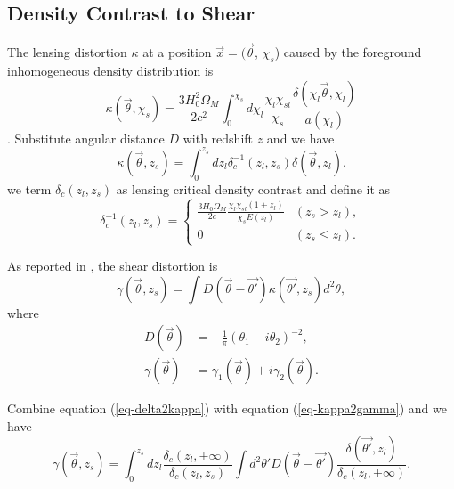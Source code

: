 \documentclass[twocolumn]{aastex62}
\newcommand{\vecb}[1]{{#1}}
\begin{document}
\subsection{Density Contrast to Shear}
The lensing distortion $\kappa$ at a position $\vec{x}=(\vec{\theta}$, $\chi_s$) caused by the foreground inhomogeneous density distribution is
\begin{equation}
\kappa(\vec{\theta},\chi_s)=\frac{3H_0^2\Omega_M}{2 c^2} \int_0^{\chi_s} d\chi_l \frac{\chi_l \chi_{sl}}{\chi_s} \frac{\delta(\chi_l \vec{\theta},\chi_l)}{a(\chi_l)}
\end{equation}
\citep{massMap-Glimpse3D2014}.
Substitute angular distance $D$ with redshift $z$ and we have
\begin{equation}\label{eq-delta2kappa}
\kappa(\vec{\theta},z_s)=\int_0^{z_s} dz_l \delta_{c}^{-1}(z_l,z_s)\delta(\vec{\theta},z_l).
\end{equation}
we term $\delta_{c}(z_l,z_s)$ as lensing critical density contrast and define it as
\begin{equation}
\delta_{c}^{-1}(z_l,z_s) =
\begin{cases}
\frac{3H_0\Omega_M}{2 c} \frac{\chi_l \chi_{sl} (1+z_l)}{ \chi_s E(z_l)} & (z_s>z_l),\\
0&(z_s \leq z_l).
\end{cases}
\end{equation}

As reported in \citet{massMap-KS1993}, the shear distortion is
\begin{equation}\label{eq-kappa2gamma}
\vecb{\gamma}(\vec{\theta},z_s) = \int \vecb{D}(\vec{\theta}-\vec{\theta'}) \kappa(\vec{\theta'},z_s) d^2 \theta,
\end{equation}
where
\begin{equation}
\begin{split}
\vecb{D}(\vec{\theta})&=-\frac{1}{\pi}(\theta_1-i\theta_2)^{-2},\\
\vecb{\gamma}(\vec{\theta})&=\gamma_1(\vec{\theta})+i\gamma_2(\vec{\theta}).
\end{split}
\end{equation}



Combine equation (\ref{eq-delta2kappa}) with equation (\ref{eq-kappa2gamma}) and we have
\begin{equation}\label{eq-delta2gamma-z}
\vecb{\gamma}(\vec{\theta},z_s) = \int_0^{z_s} dz_l \frac{\delta_c(z_l,+\infty)}{\delta_{c}(z_l,z_s)} \int d^2 \theta'  \vecb{D}(\vec{\theta}-\vec{\theta'}) \frac{\delta(\vec{\theta'},z_l)}{\delta_c(z_l,+\infty)}.
\end{equation}
\end{document}
